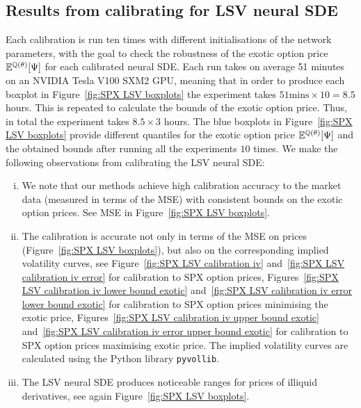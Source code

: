 \subsection{Results from calibrating for LSV neural SDE}
Each calibration is run ten times with different initialisations of the network parameters, with the goal to check the robustness of the exotic option price 
 $\mathbb{E}^{\mathbb{Q}(\theta)}[\Psi]$ for each calibrated neural SDE. Each run takes on average 51 minutes on an NVIDIA Tesla V100 SXM2 GPU, meaning that in order to produce each boxplot in Figure~\ref{fig:SPX LSV boxplots} the experiment takes $51 \text{mins} \times 10 = 8.5$ hours. This is repeated to calculate the bounds of the exotic option price. Thus, in total the experiment takes $8.5 \times 3$ hours.
The blue boxplots in Figure~\ref{fig:SPX LSV boxplots} provide different quantiles for the exotic option 
 price $\mathbb{E}^{\mathbb{Q}(\theta)}[\Psi]$ and the obtained bounds after running all the experiments $10$ times. 
We make the following observations from calibrating the LSV neural SDE:

\begin{enumerate}[i)]
\item We note that our methods achieve high calibration accuracy to the market data (measured in terms of the MSE) with consistent bounds on the exotic option prices. See MSE in Figure~\ref{fig:SPX LSV boxplots}.
\item The calibration is accurate not only in terms of the MSE on prices (Figure~\ref{fig:SPX LSV boxplots}), but also on the corresponding implied volatility curves, see Figure~\ref{fig:SPX LSV calibration iv} and~\ref{fig:SPX LSV calibration iv error} for calibration to SPX option prices, Figures~\ref{fig:SPX LSV calibration iv lower bound exotic} and~\ref{fig:SPX LSV calibration iv error lower bound exotic} for calibration to SPX option prices minimising the exotic price, Figures~\ref{fig:SPX LSV calibration iv upper bound exotic} and~\ref{fig:SPX LSV calibration iv error upper bound exotic} for calibration to SPX option prices maximising exotic price. The implied volatility curves are calculated using the Python library \texttt{pyvollib}.
\item The LSV neural SDE produces noticeable ranges for prices of illiquid derivatives, see again Figure~\ref{fig:SPX LSV boxplots}.  
\end{enumerate}



